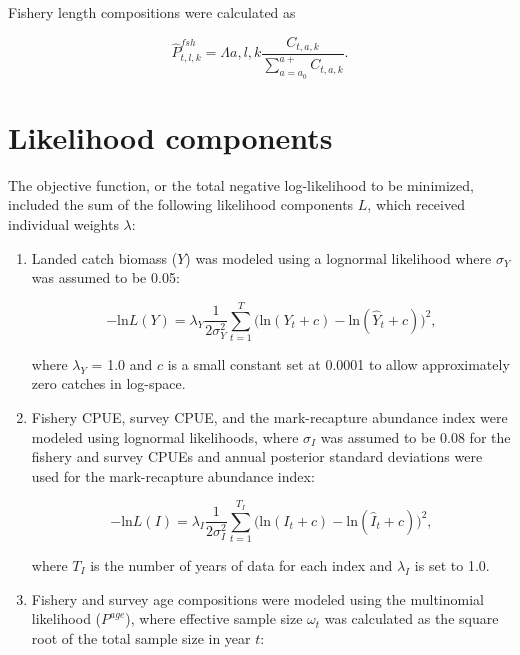 \documentclass[]{article}
\begin{document}
Fishery length compositions were calculated as

\begin{equation}
\hat{P}_{t,l,k}^{fsh}=\Lambda{a,l,k}\frac{C_{t,a,k}}{\sum_{a=a_0}^{a+} C_{t,a,k}}.
\label{eq:predfshlen}
\end{equation}

\section{Likelihood components}\label{likelihood-components}

The objective function, or the total negative log-likelihood to be
minimized, included the sum of the following likelihood components
\(L\), which received individual weights \(\lambda\):

\begin{enumerate}
\def\labelenumi{\arabic{enumi}.}
\item
  Landed catch biomass (\(Y\)) was modeled using a lognormal likelihood
  where \(\sigma_Y\) was assumed to be 0.05:

  \begin{equation}
  -\mbox{ln}L(Y)=\lambda_Y\frac{1}{2\sigma_Y^2}\sum_{t=1}^{T}\Big(\mbox{ln}(Y_t+c)-\mbox{ln}(\hat{Y}_t+c)\Big)^2 ,
  \label{eq:catchlike}
  \end{equation}

  where \(\lambda_Y\) = 1.0 and \(c\) is a small constant set at 0.0001
  to allow approximately zero catches in log-space.
\item
  Fishery CPUE, survey CPUE, and the mark-recapture abundance index were
  modeled using lognormal likelihoods, where \(\sigma_I\) was assumed to
  be 0.08 for the fishery and survey CPUEs and annual posterior standard
  deviations were used for the mark-recapture abundance index:

  \begin{equation}
  -\mbox{ln}L(I)=\lambda_I\frac{1}{2\sigma_I^2}\sum_{t=1}^{T_I}\Big(\mbox{ln}(I_t+c)-\mbox{ln}(\hat{I}_t+c)\Big)^2 ,
  \label{eq:indexlike}
  \end{equation}

  where \(T_I\) is the number of years of data for each index and
  \(\lambda_I\) is set to 1.0.
\item
  Fishery and survey age compositions were modeled using the multinomial
  likelihood (\(P^{age}\)), where effective sample size \(\omega_t\) was
  calculated as the square root of the total sample size in year \(t\):


\end{enumerate}
\end{document}
